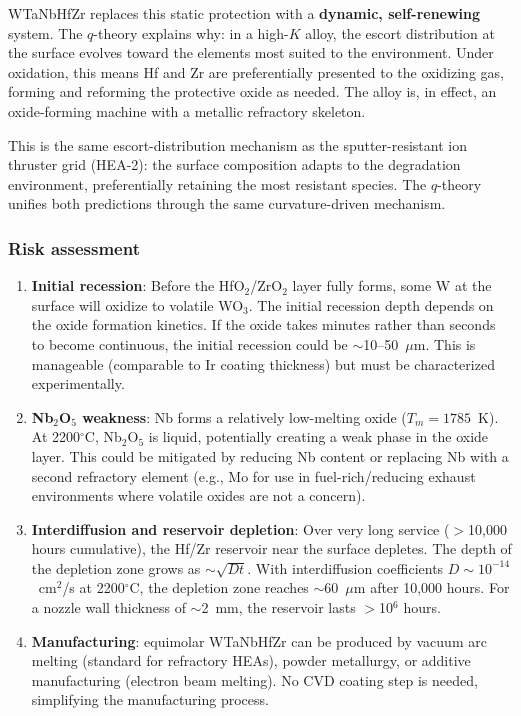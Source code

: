 \documentclass[12pt,letterpaper]{article}
\theoremstyle{definition}
\begin{document}
WTaNbHfZr replaces this static protection with a \textbf{dynamic, self-renewing} system.  The $q$-theory explains why: in a high-$K$ alloy, the escort distribution at the surface evolves toward the elements most suited to the environment.  Under oxidation, this means Hf and Zr are preferentially presented to the oxidizing gas, forming and reforming the protective oxide as needed.  The alloy is, in effect, an oxide-forming machine with a metallic refractory skeleton.

This is the same escort-distribution mechanism as the sputter-resistant ion thruster grid (HEA-2): the surface composition adapts to the degradation environment, preferentially retaining the most resistant species.  The $q$-theory unifies both predictions through the same curvature-driven mechanism.

\subsubsection{Risk assessment}

\begin{enumerate}
  \item \textbf{Initial recession}: Before the HfO$_2$/ZrO$_2$ layer fully forms, some W at the surface will oxidize to volatile WO$_3$.  The initial recession depth depends on the oxide formation kinetics.  If the oxide takes minutes rather than seconds to become continuous, the initial recession could be $\sim$10--50~$\mu$m.  This is manageable (comparable to Ir coating thickness) but must be characterized experimentally.
  \item \textbf{Nb$_2$O$_5$ weakness}: Nb forms a relatively low-melting oxide ($T_m = 1785$~K).  At 2200$^\circ$C, Nb$_2$O$_5$ is liquid, potentially creating a weak phase in the oxide layer.  This could be mitigated by reducing Nb content or replacing Nb with a second refractory element (e.g., Mo for use in fuel-rich/reducing exhaust environments where volatile oxides are not a concern).
  \item \textbf{Interdiffusion and reservoir depletion}: Over very long service ($>$10,000 hours cumulative), the Hf/Zr reservoir near the surface depletes.  The depth of the depletion zone grows as $\sim\sqrt{Dt}$.  With interdiffusion coefficients $D \sim 10^{-14}$~cm$^2$/s at 2200$^\circ$C, the depletion zone reaches $\sim$60~$\mu$m after 10,000 hours.  For a nozzle wall thickness of $\sim$2~mm, the reservoir lasts $>$10$^6$ hours.
  \item \textbf{Manufacturing}: equimolar WTaNbHfZr can be produced by vacuum arc melting (standard for refractory HEAs), powder metallurgy, or additive manufacturing (electron beam melting).  No CVD coating step is needed, simplifying the manufacturing process.
\end{enumerate}
\end{document}

